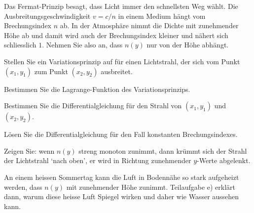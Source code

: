Das Fermat-Prinzip besagt, dass Licht immer den schnellsten Weg wählt.
Die Ausbreitungsgeschwindigkeit $v=c/n$ in einem Medium hängt vom
Brechungsindex $n$ ab.
In der Atmosphäre nimmt die Dichte mit zunehmender Höhe ab und damit
wird auch der Brechungsindex kleiner und nähert sich schliesslich $1$.
Nehmen Sie also an, dass $n(y)$ nur von der Höhe abhängt.
\begin{teilaufgaben}
\item
Stellen Sie ein Variationsprinzip auf für einen Lichtstrahl, der sich
vom Punkt $(x_1,y_1)$ zum Punkt $(x_2,y_2)$ ausbreitet.
\item
Bestimmen Sie die Lagrange-Funktion des Variationsprinzips.
\item
Bestimmen Sie die Differentialgleichung für den Strahl von $(x_1,y_1)$
und $(x_2,y_2)$.
\item 
Lösen Sie die Differentialgleichung für den Fall konstanten Brechungsindexes.
\item
Zeigen Sie: wenn $n(y)$ streng monoton zunimmt, dann krümmt sich der Strahl
der Lichtstrahl `nach oben', er wird in Richtung zunehmender $y$-Werte
abgelenkt.
\end{teilaufgaben}
An einem heissen Sommertag kann die Luft in Bodennähe so stark aufgeheizt
werden, dass $n(y)$ mit zunehmender Höhe zunimmt.
Teilaufgabe e) erklärt dann, warum diese heisse Luft 
Spiegel wirken und daher wie Wasser aussehen kann.

